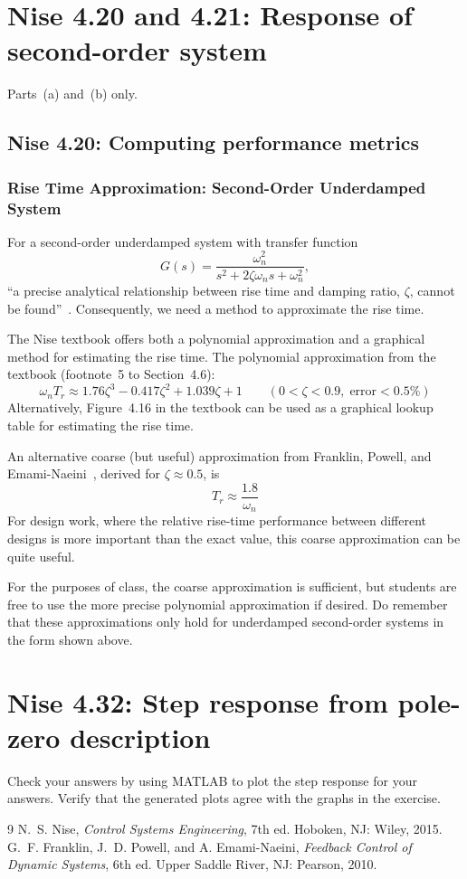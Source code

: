 \documentclass[11pt]{article}
\begin{document}
\section*{Nise 4.20 and 4.21: Response of second-order system}

Parts~(a) and~(b) only.

\subsection*{Nise 4.20: Computing performance metrics}

\subsubsection*{Rise Time Approximation: Second-Order Underdamped System}
For a second-order underdamped system with transfer function
\[
  G(s) = \frac{\omega_n^2}{s^2 + 2\zeta\omega_n s + \omega_n^2},
\]
``a precise analytical relationship between rise time and damping ratio, $\zeta$, cannot be found''~\cite[Sec.~4.6]{nise2015}.  Consequently, we need a method to approximate the rise time.  

The Nise textbook offers both a polynomial approximation and a graphical method for estimating the rise time.  The polynomial approximation from
the textbook (footnote~5 to Section~4.6):
\[
  \omega_n T_r \approx 1.76\zeta^3 - 0.417\zeta^2 + 1.039\zeta + 1
  \qquad (0 < \zeta < 0.9,\;\text{error} < 0.5\%)
\]
Alternatively, Figure~4.16 in the textbook can be used as a graphical lookup table for estimating the rise time.


An alternative coarse (but useful) approximation from Franklin, Powell, and Emami-Naeini~\cite[Sec.~3.4]{franklin2010}, derived for $\zeta \approx 0.5$, is
\[
T_r \approx \frac{1.8}{\omega_n}
\]
For design work, where the relative rise-time performance between different designs is more important than the exact value, this coarse approximation can be quite useful.

For the purposes of class, the coarse approximation is sufficient, but students are free to use the more precise polynomial approximation if desired.  Do remember that these approximations only hold for underdamped second-order systems in the form shown above.  


\section*{Nise 4.32: Step response from pole-zero description}

Check your answers by using MATLAB to plot the step response for your answers.  Verify that
the generated plots agree with the graphs in the exercise.

\begin{thebibliography}{9}
 N.~S. Nise, \emph{Control Systems Engineering}, 7th ed. Hoboken, NJ: Wiley, 2015.
 G.~F. Franklin, J.~D. Powell, and A. Emami-Naeini, \emph{Feedback Control of Dynamic Systems}, 6th ed. Upper Saddle River, NJ: Pearson, 2010.
\end{thebibliography}
\end{document}
